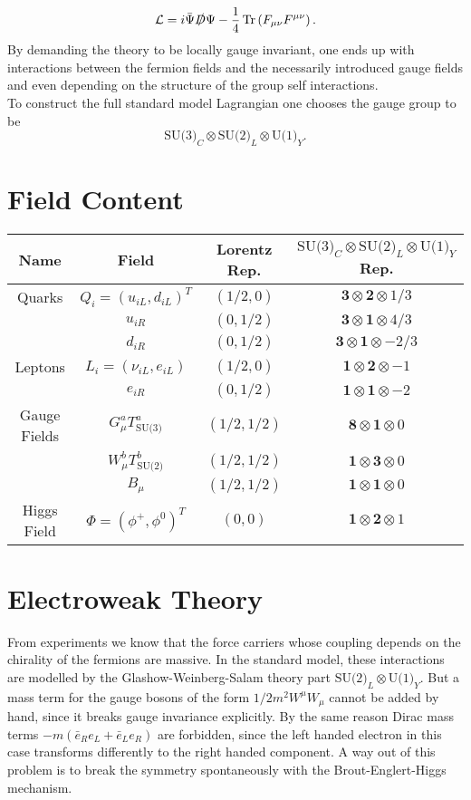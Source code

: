 \begin{equation}
\mathcal{L}= i\bar{\Psi}\slashed{D} \Psi-\frac{1}{4}\operatorname{Tr}\left(F_{\mu\nu}F^{\mu\nu}\right) .
\end{equation}
By demanding the theory to be locally gauge invariant, one ends up with interactions between the fermion fields and the necessarily introduced gauge fields and even depending on the structure of the group self interactions.\\
To construct the full standard model Lagrangian one chooses the gauge group to be
\begin{equation}
\text{SU(3)}_C\otimes\text{SU(2)}_L\otimes\text{U(1)}_Y .
\end{equation}

\section{Field Content}
\begin{table}[H]
\centering
\begin{tabular}{|cccc|}
\hline
Name & Field & Lorentz Rep. & $\text{SU(3)}_C\otimes\text{SU(2)}_L\otimes\text{U(1)}_Y$ Rep.\\ 
\hline 
Quarks & $Q_i=(u_{iL},d_{iL})^T$ & $(1/2,0)$ & $\textbf{3}\otimes\textbf{2}\otimes 1/3$ \\ 
 & $u_{iR}$ & $(0,1/2)$ & $\textbf{3}\otimes\textbf{1}\otimes 4/3$\\ 
 & $d_{iR}$ & $(0,1/2)$ & $\textbf{3}\otimes\textbf{1}\otimes -2/3$\\ 
Leptons & $L_i=(\nu_{iL},e_{iL})$ & $(1/2,0)$  & $\textbf{1}\otimes\textbf{2}\otimes -1$ \\ 
 & $e_{iR}$ & $(0,1/2)$ & $\textbf{1}\otimes\textbf{1}\otimes -2$ \\ 
Gauge Fields & $G_\mu^a T^a_{\text{SU(3)}}$ & $(1/2,1/2)$ & $\textbf{8}\otimes\textbf{1}\otimes 0$ \\ 
 & $W_\mu^b T^b_{\text{SU(2)}}$ & $(1/2,1/2)$ & $\textbf{1}\otimes\textbf{3}\otimes 0$ \\ 
 & $B_\mu$ & $(1/2,1/2)$ & $\textbf{1}\otimes\textbf{1}\otimes 0$ \\ 
Higgs Field & $\Phi=(\phi^+,\phi^0)^T$ & $(0,0)$ & $\textbf{1}\otimes\textbf{2}\otimes 1$ \\ 
\hline 
\end{tabular} 
\end{table}
\section{Electroweak Theory}
From experiments we know that the force carriers whose coupling depends on the chirality of the fermions are massive. In the standard model, these interactions are modelled by the Glashow-Weinberg-Salam theory part $\text{SU(2)}_L\otimes\text{U(1)}_Y$. But a mass term for the gauge bosons of the form $1/2 m^2 W^\mu W_\mu$ cannot be added by hand, since it breaks gauge invariance explicitly. By the same reason Dirac mass terms $-m(\bar{e}_Re_L+\bar{e}_L e_R)$ are forbidden, since the left handed electron in this case transforms differently to the right handed component.
A way out of this problem is to break the symmetry spontaneously with the Brout-Englert-Higgs mechanism.

